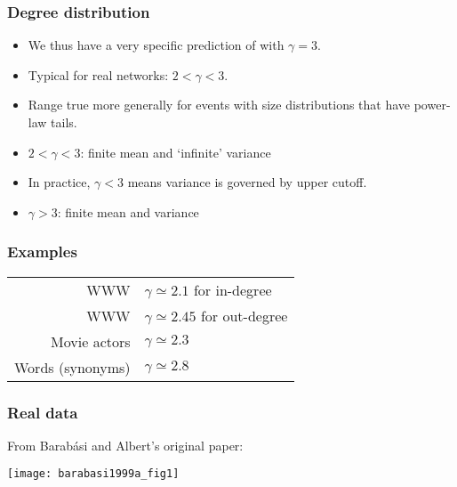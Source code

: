 \begin{frame}[label=]
 \frametitle{Degree distribution}

 \begin{itemize}
  \item<1-> 
    We thus have a very specific prediction of 
     with \alert{$\gamma=3$}.
  \item<2-> 
    Typical for real networks: \alert{$2 < \gamma < 3$}.
  \item<3-> 
    Range true more generally for events with size
    distributions that have power-law tails.
  \item<4->
    \alert{$2 < \gamma < 3$}: finite mean and `infinite' variance
  \item<5->
    In practice, $\gamma < 3$ means variance is governed
    by upper cutoff.
  \item<6->
    \alert{$\gamma > 3$}: finite mean and variance 
 \end{itemize}

\end{frame}

\begin{frame}[label=]
 \frametitle{Examples}  

  \begin{center}
    \begin{tabular}{rl}
      WWW & $\gamma \simeq 2.1$ for in-degree \\
      WWW & $\gamma \simeq 2.45$ for out-degree \\
      Movie actors & $\gamma \simeq 2.3$ \\
      Words (synonyms) & $\gamma \simeq 2.8$ \\
    \end{tabular}
  \end{center}


\end{frame}

\begin{frame}[label=]
 \frametitle{Real data}  

 From Barab\'{a}si and Albert's original paper\cite{barabasi1999a}:

 \texttt{[image: barabasi1999a\_fig1]}
 
\end{frame}


